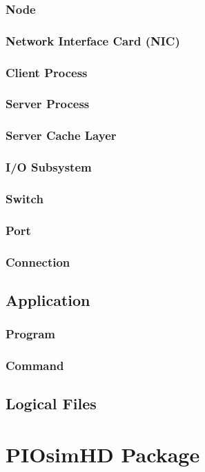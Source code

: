 \documentclass[
     11pt,         %
     a4paper,      %
     BCOR10mm,     %
     DIV14,        %
     liststotoc,   %
     bibtotoc,     %
     idxtotoc,     %
     parskip       %
     ]{scrreprt}   %
\begin{document}
\subsection{Node}
\subsection{Network Interface Card (NIC)}
\subsection{Client Process}
\subsection{Server Process}
\subsection{Server Cache Layer}
\subsection{I/O Subsystem}
\subsection{Switch}
\subsection{Port}
\subsection{Connection}

\section{Application}
\subsection{Program}
\subsection{Command}

\section{Logical Files}



\chapter{PIOsimHD Package}
\end{document}
